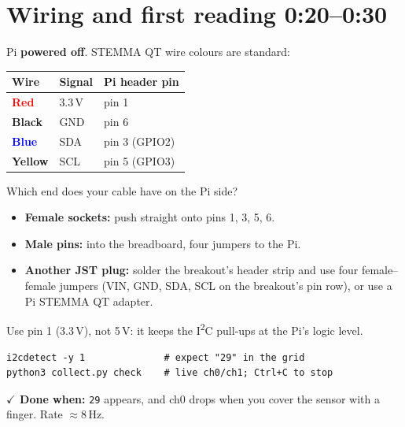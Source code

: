 \documentclass[11pt]{article}
\newcommand{\done}[1]{\par\smallskip\textcolor{ok}{\textbf{\(\checkmark\) Done when:}} #1\par}
\newcommand{\clock}[1]{\hfill\textcolor{black!55}{\small\textbf{#1}}}
\begin{document}
\section{Wiring and first reading \clock{0:20--0:30}}
Pi \textbf{powered off}. STEMMA QT wire colours are standard:

\begin{minipage}{0.52\linewidth}
\begin{tabular}{@{}lll@{}}
\toprule
Wire & Signal & Pi header pin \\
\midrule
\textcolor{red}{\textbf{Red}} & 3.3\,V & pin 1 \\
\textbf{Black} & GND & pin 6 \\
\textcolor{blue}{\textbf{Blue}} & SDA & pin 3 (GPIO2) \\
\textcolor{orange!90!black}{\textbf{Yellow}} & SCL & pin 5 (GPIO3) \\
\bottomrule
\end{tabular}
\end{minipage}\hfill
\begin{minipage}{0.44\linewidth}
\centering
{}
\end{minipage}

\smallskip
Which end does your cable have on the Pi side?
\begin{itemize}
\item \textbf{Female sockets:} push straight onto pins 1, 3, 5, 6.
\item \textbf{Male pins:} into the breadboard, four jumpers to the Pi.
\item \textbf{Another JST plug:} solder the breakout's header strip and use four female--female jumpers
  (VIN, GND, SDA, SCL on the breakout's pin row), or use a Pi STEMMA QT adapter.
\end{itemize}
Use pin 1 (3.3\,V), not 5\,V: it keeps the I\textsuperscript{2}C pull-ups at the Pi's logic level.
\begin{lstlisting}
i2cdetect -y 1              # expect "29" in the grid
python3 collect.py check    # live ch0/ch1; Ctrl+C to stop
\end{lstlisting}
\done{\texttt{29} appears, and ch0 drops when you cover the sensor with a finger. Rate $\approx$8\,Hz.}
\end{document}
